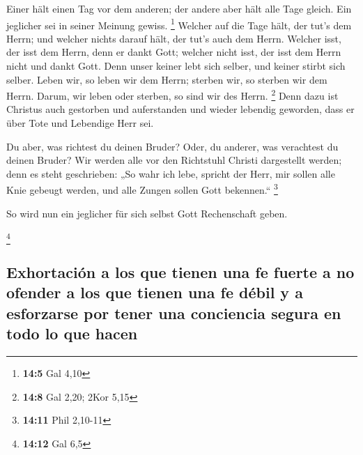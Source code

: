  Einer hält einen Tag vor dem anderen; der andere aber
hält alle Tage gleich. Ein jeglicher sei in seiner Meinung gewiss.
\footnote{\textbf{14:5} Gal 4,10}  Welcher auf die Tage
hält, der tut's dem Herrn; und welcher nichts darauf hält, der tut's
auch dem Herrn. Welcher isst, der isst dem Herrn, denn er dankt Gott;
welcher nicht isst, der isst dem Herrn nicht und dankt Gott.
 Denn unser keiner lebt sich selber, und keiner stirbt
sich selber.  Leben wir, so leben wir dem Herrn; sterben
wir, so sterben wir dem Herrn. Darum, wir leben oder sterben, so sind
wir des Herrn. \footnote{\textbf{14:8} Gal 2,20; 2Kor 5,15}
 Denn dazu ist Christus auch gestorben und auferstanden
und wieder lebendig geworden, dass er über Tote und Lebendige Herr sei.

 Du aber, was richtest du deinen Bruder? Oder, du
anderer, was verachtest du deinen Bruder? Wir werden alle vor den
Richtstuhl Christi dargestellt werden;  denn es steht
geschrieben: „So wahr ich lebe, spricht der Herr, mir sollen alle Knie
gebeugt werden, und alle Zungen sollen Gott bekennen.`` \footnote{\textbf{14:11}
  Phil 2,10-11}

 So wird nun ein jeglicher für sich selbst Gott
Rechenschaft geben.

\footnote{\textbf{14:12} Gal 6,5}

\hypertarget{exhortaciuxf3n-a-los-que-tienen-una-fe-fuerte-a-no-ofender-a-los-que-tienen-una-fe-duxe9bil-y-a-esforzarse-por-tener-una-conciencia-segura-en-todo-lo-que-hacen}{%
\subsection{Exhortación a los que tienen una fe fuerte a no ofender a
los que tienen una fe débil y a esforzarse por tener una conciencia
segura en todo lo que
hacen}\label{exhortaciuxf3n-a-los-que-tienen-una-fe-fuerte-a-no-ofender-a-los-que-tienen-una-fe-duxe9bil-y-a-esforzarse-por-tener-una-conciencia-segura-en-todo-lo-que-hacen}}

